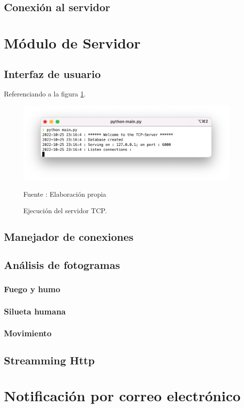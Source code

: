 \subsection{Conexión al servidor}

\section{Módulo de Servidor}
\subsection{Interfaz de usuario}
Referenciando a la figura \ref{fig:servertcp_console}.
\begin{figure}[H]
    \begin{center}
        \includegraphics[width=15cm]{img/capitulo_5/tcp_server.png}
        \caption{Ejecución del servidor TCP.}
        Fuente : Elaboración propia
        \label{fig:servertcp_console}
    \end{center}
\end{figure}

\subsection{Manejador de conexiones}

\subsection{Análisis de fotogramas}
\subsubsection{Fuego y humo}
\subsubsection{Silueta humana}
\subsubsection{Movimiento}
\subsection{Streamming Http}
\section{Notificación por correo electrónico}